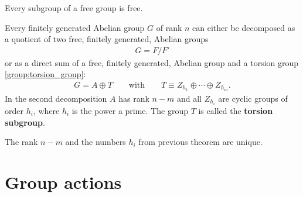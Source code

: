     \begin{property}
        Every subgroup of a free group is free.
    \end{property}

    \begin{theorem}\label{group:theorem:free_group}
        Every finitely generated Abelian group $G$ of rank $n$ can either be decomposed as a quotient of two free, finitely generated, Abelian groups
        \begin{gather}
            G = F/F'
        \end{gather}
        or as a direct sum of a free, finitely generated, Abelian group and a torsion group \ref{group:torsion_group}:
        \begin{gather}
            G = A\oplus T \qquad\text{with}\qquad T\equiv Z_{h_1}\oplus\cdots\oplus Z_{h_m}.
        \end{gather}
        In the second decomposition $A$ has rank $n-m$ and all $Z_{h_i}$ are cyclic groups of order $h_i$, where $h_i$ is the power a prime. The group $T$ is called the \textbf{torsion subgroup}.
    \end{theorem}
    \begin{property}[Uniqueness]
        The rank $n-m$ and the numbers $h_i$ from previous theorem are unique.
    \end{property}

\section{Group actions}\label{section:group_actions}


